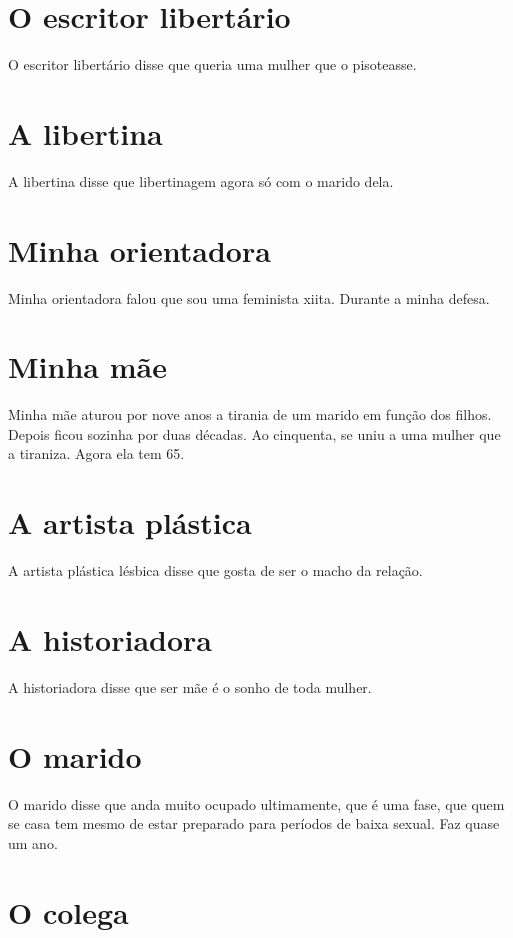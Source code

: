 \chapter{O escritor libertário}

O escritor libertário disse que queria uma mulher que o pisoteasse.

\chapter{A libertina}

A libertina disse que libertinagem agora só com o marido dela.

\chapter{Minha orientadora}

Minha orientadora falou que sou uma feminista xiita. Durante a minha
defesa.

\chapter{Minha mãe}

Minha mãe aturou por nove anos a tirania de um marido em função dos
filhos. Depois ficou sozinha por duas décadas. Ao cinquenta, se uniu a
uma mulher que a tiraniza. Agora ela tem 65.

\chapter{A artista plástica}

A artista plástica lésbica disse que gosta de ser o macho da relação.

\chapter{A historiadora}

A historiadora disse que ser mãe é o sonho de toda mulher.

\chapter{O marido}

O marido disse que anda muito ocupado ultimamente, que é uma fase, que
quem se casa tem mesmo de estar preparado para períodos de baixa sexual.
Faz quase um ano.

\chapter{O colega}

